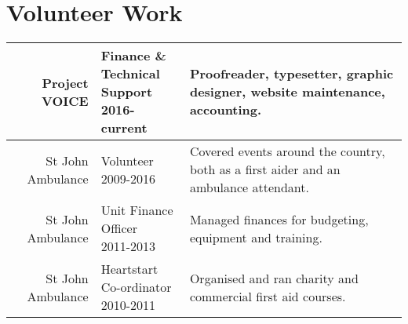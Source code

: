 \documentclass[letterpaper]{deedy-resume} %
\begin{document}
\begin{minipage}[t]{\textwidth} %

\section{Volunteer Work} 

\begin{tabular}{rlm{12cm}}
Project VOICE & \makecell[l]{Finance \& \\ Technical Support \\  2016-current} & Proofreader, typesetter, graphic designer, website maintenance, accounting. \\
\hline
St John Ambulance & \makecell[l]{Volunteer \\ 2009-2016} & Covered events around the country, both as a first aider and an ambulance attendant. \\
\hline
St John Ambulance & \makecell[l]{Unit Finance \\ Officer \\ 2011-2013} &
Managed finances for budgeting, equipment and training. \\
\hline
St John Ambulance & \makecell[l]{Heartstart \\ Co-ordinator \\ 2010-2011} &
Organised and ran charity and commercial first aid courses. \\
\end{tabular}



\end{minipage} %








\end{document}

